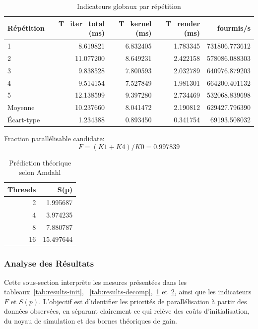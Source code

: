 \begin{table}[H]
\centering
\small
\caption{Indicateurs globaux par répétition}
\label{tab:results-global}
\begin{tabular}{@{}lrrrr@{}}
\toprule
\textbf{Répétition} & \textbf{T\_iter\_total (ms)} & \textbf{T\_kernel (ms)} & \textbf{T\_render (ms)} & \textbf{fourmis/s} \\
\midrule
1 & 8.619821 & 6.832405 & 1.783345 & 731806.773612 \\
2 & 11.077200 & 8.649231 & 2.422158 & 578086.088303 \\
3 & 9.838528 & 7.800593 & 2.032789 & 640976.879203 \\
4 & 9.514154 & 7.527849 & 1.981301 & 664200.401132 \\
5 & 12.138599 & 9.397280 & 2.734469 & 532068.839698 \\
Moyenne & 10.237660 & 8.041472 & 2.190812 & 629427.796390 \\
Écart-type & 1.234388 & 0.893450 & 0.341754 & 69193.508032 \\
\bottomrule
\end{tabular}
\end{table}

\noindent
Fraction parallélisable candidate:
\[
F = (K1 + K4) / K0 = 0.997839
\]

\begin{table}[H]
\centering
\caption{Prédiction théorique selon Amdahl}
\label{tab:results-amdahl}
\begin{tabular}{@{}rr@{}}
\toprule
\textbf{Threads} & \textbf{S(p)} \\
\midrule
2 & 1.995687 \\
4 & 3.974235 \\
8 & 7.880787 \\
16 & 15.497644 \\
\bottomrule
\end{tabular}
\end{table}

\subsubsection{Analyse des Résultats}

\noindent
Cette sous-section interprète les mesures présentées dans les tableaux~\ref{tab:results-init},
~\ref{tab:results-decomp},~\ref{tab:results-global} et~\ref{tab:results-amdahl}, ainsi que les
indicateurs \(F\) et \(S(p)\).
L'objectif est d'identifier les priorités de parallélisation à partir des données observées,
en séparant clairement ce qui relève des coûts d'initialisation, du noyau de simulation et des
bornes théoriques de gain.

